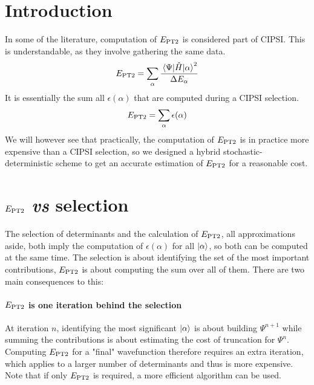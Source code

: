 \documentclass[./thesis.tex]{subfiles}
\begin{document}
\label{chap:PT2}

\section{Introduction}


In some of the literature, computation of $E_\text{PT2}$ is considered part of CIPSI. This is understandable, as they involve gathering the same data.
\begin{equation}
E_\text{PT2} = \sum_\alpha \frac{\mel{\Psi}{\hat{H}}{\alpha}^2}{\Delta E_\alpha}
\end{equation}
It is essentially the sum all $\epsilon(\alpha)$ that are computed during a CIPSI selection.
\begin{equation}
E_\text{PT2} = \sum_\alpha \epsilon(\alpha)
\end{equation}
We will however see that practically, the computation of $E_\text{PT2}$ is in practice more expensive than a CIPSI selection, so we designed a hybrid stochastic-deterministic scheme to get an accurate estimation of $E_\text{PT2}$ for a reasonable cost. 

\section{$E_\text{PT2}$ \textit{vs} selection}

The selection of determinants and the calculation of $E_\text{PT2}$, all approximations aside, both imply the computation of $\epsilon(\alpha)$ for all $\ket \alpha$, so both can be computed at the same time. The selection is about identifying the set of the most important contributions, $E_\text{PT2}$ is about computing the sum over all of them. There are two main consequences to this:
\paragraph{$E_\text{PT2}$ is one iteration behind the selection}
At iteration $n$, identifying the most significant $\ket \alpha$ is about building $\Psi^{n+1}$ while summing the contributions is about estimating the cost of truncation for $\Psi^{n}$. Computing $E_\text{PT2}$ for a "final" wavefunction therefore requires an extra iteration, which applies to a larger number of determinants and thus is more expensive. Note that if only $E_\text{PT2}$ is required, a more efficient algorithm can be used.\cite{Cimiraglia_1996}
\end{document}
